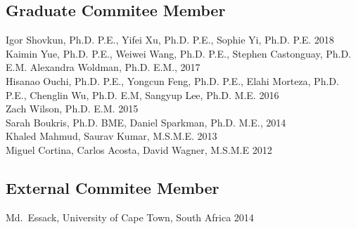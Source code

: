 \subsection*{Graduate Commitee Member}
Igor Shovkun, Ph.D. P.E., Yifei Xu, Ph.D. P.E., Sophie Yi, Ph.D. P.E. 2018 \\
Kaimin Yue, Ph.D. P.E., Weiwei Wang, Ph.D. P.E., Stephen Castonguay, Ph.D. E.M. Alexandra Woldman, Ph.D. E.M., 2017 \\ 
Hisanao Ouchi, Ph.D. P.E., Yongcun Feng, Ph.D. P.E., Elahi Morteza, Ph.D. P.E., Chenglin Wu, Ph.D. E.M, Sangyup Lee, Ph.D. M.E. 2016 \\
Zach Wilson, Ph.D. E.M. 2015\\
Sarah Boukris, Ph.D. BME, Daniel Sparkman, Ph.D. M.E., 2014 \\
Khaled Mahmud, Saurav Kumar, M.S.M.E. 2013 \\
Miguel Cortina, Carlos Acosta, David Wagner, M.S.M.E 2012 

\subsection*{External Commitee Member}
Md.~Essack, University of Cape Town, South Africa 2014
